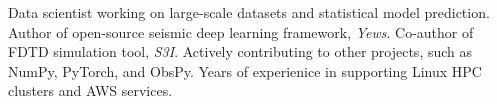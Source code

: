 

\begin{cvparagraph}

	Data scientist working on large-scale datasets and statistical model prediction.
	Author of open-source seismic deep learning framework, \textit{Yews}. Co-author of FDTD simulation tool, \textit{S3I}. Actively contributing to other projects, such as NumPy, PyTorch, and ObsPy.
	Years of experienice in supporting Linux HPC clusters and AWS services.
\end{cvparagraph}
